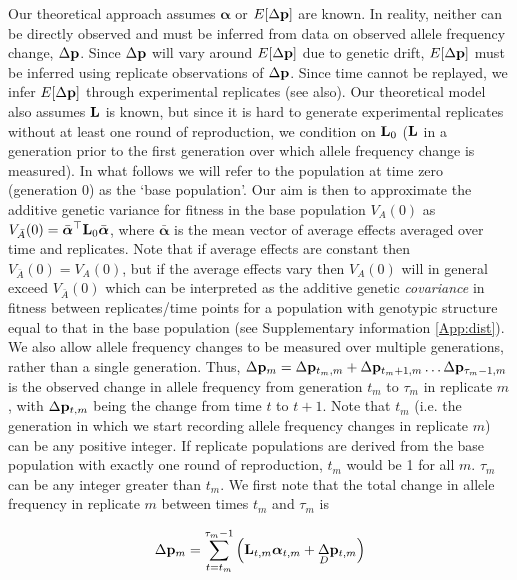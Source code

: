 \documentclass[12pt]{article}
\begin{document}
\begin{bibunit}
Our theoretical approach assumes $\boldsymbol{\alpha}$ or $E[\Delta {\bf p}]$ are known. In reality, neither can be directly observed and must be inferred from data on observed allele frequency change, $\Delta {\bf p}$. Since $\Delta {\bf p}$ will vary around $E[\Delta {\bf p}]$ due to genetic drift, $E[\Delta {\bf p}]$ must be inferred using replicate observations of $\Delta {\bf p}$. Since time cannot be replayed, we infer $E[\Delta {\bf p}]$ through experimental replicates (see \citet{Buffalo.2020} also). Our theoretical model also assumes ${\bf L}$ is known, but since it is hard to generate experimental replicates without at least one round of reproduction, we condition on ${\bf L}_{0}$ (${\bf L}$ in a generation prior to the first generation over which allele frequency change is measured). In what follows we will refer to the population at time zero (generation 0) as the `base population'. Our aim is then to approximate the additive genetic variance for fitness in the base population $V_A(0)$ as $V_{\bar A}(0)=\bar{\boldsymbol{\alpha}}^{\top}{\bf L}_0\bar{\boldsymbol{\alpha}}$, where $\bar{\boldsymbol{\alpha}}$ is the mean vector of average effects averaged over time and replicates. Note that if average effects are constant then $V_{\bar A}(0)=V_A(0)$, but if the average effects vary then $V_A(0)$ will in general exceed $V_{\bar A}(0)$ which can be interpreted as the additive genetic \emph{covariance} in fitness between replicates/time points for a population with genotypic structure equal to that in the base population (see Supplementary information \ref{App:dist}).\\

We also allow allele frequency changes to be measured over multiple generations, rather than a single generation. Thus, $\Delta {\bf p}_m = \Delta {\bf p}_{t_m,m}+\Delta {\bf p}_{t_m+1,m}\dots\Delta {\bf p}_{\tau_m-1,m}$ is the observed change in allele frequency from generation $t_m$ to $\tau_m$ in replicate $m$, with $\Delta {\bf p}_{t,m}$ being the change from time $t$ to $t+1$. Note that $t_m$ (i.e. the generation in which we start recording allele frequency changes in replicate $m$) can be any positive integer. If replicate populations are derived from the base population with exactly one round of reproduction, $t_m$ would be 1 for all $m$. $\tau_m$ can be any integer greater than $t_m$. We first note that the total change in allele frequency in replicate $m$ between times $t_m$ and $\tau_m$ is

\begin{equation}
\Delta {\bf p}_{m} = \sum^{\tau_m-1}_{t=t_m}\left({\bf L}_{t,m}\boldsymbol{\alpha}_{t,m}+\underset{D}\Delta {\bf p}_{t,m}\right)
\end{equation}


\end{bibunit}
\end{document}

